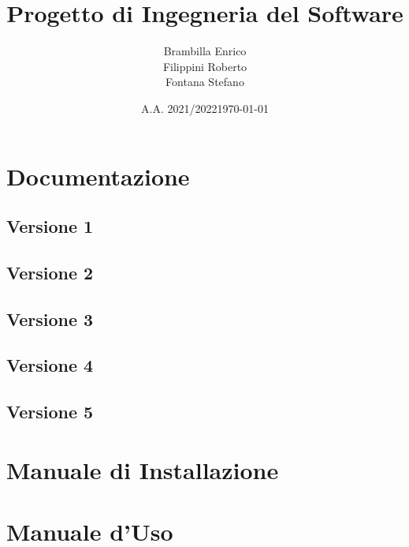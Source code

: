 \documentclass[12pt, a4paper, oneside]{book}
\title{Progetto di Ingegneria del Software}
\author{Brambilla Enrico\\Filippini Roberto\\Fontana Stefano}
\date{A.A. 2021/2022}
\date{\today}
\begin{document}
\maketitle
\cleardoublepage
{}
\tableofcontents
\cleardoublepage






\chapter{Documentazione}
\section{Versione 1}


\pagebreak
\section{Versione 2}


\pagebreak
\section{Versione 3}


\pagebreak
\section{Versione 4}


\pagebreak
\section{Versione 5}


\pagebreak
\chapter{Manuale di Installazione}


\pagebreak
\chapter{Manuale d'Uso}

\end{document}
